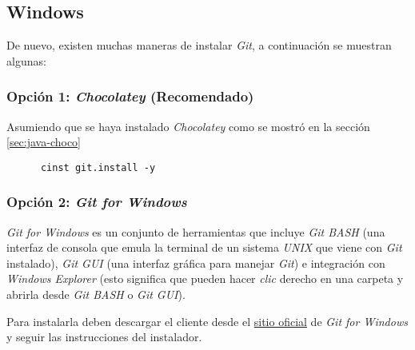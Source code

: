 \subsection{Windows}
  De nuevo, existen muchas maneras de instalar \textit{Git}, a continuación se 
  muestran algunas:

  \subsubsection{Opción 1: \textit{Chocolatey} (Recomendado)}
    Asumiendo que se haya instalado \textit{Chocolatey} como se mostró en la sección
    \ref{sec:java-choco}

    \begin{verbatim}
      cinst git.install -y
    \end{verbatim}

  \subsubsection{Opción 2: \textit{Git for Windows}}
    \textit{Git for Windows} es un conjunto de herramientas que incluye \textit{Git 
    BASH} (una interfaz de consola que emula la terminal de un sistema \textit{UNIX} 
    que viene con \textit{Git} instalado), \textit{Git GUI} (una interfaz gráfica para 
    manejar \textit{Git}) e integración con \textit{Windows Explorer} (esto significa 
    que pueden hacer \textit{clic} derecho en una carpeta y abrirla desde \textit{Git 
    BASH} o \textit{Git GUI}).
    
    Para instalarla deben descargar el cliente desde el 
    \href{https://gitforwindows.org}{sitio oficial} de \textit{Git for Windows} y 
    seguir las instrucciones del instalador.
%
